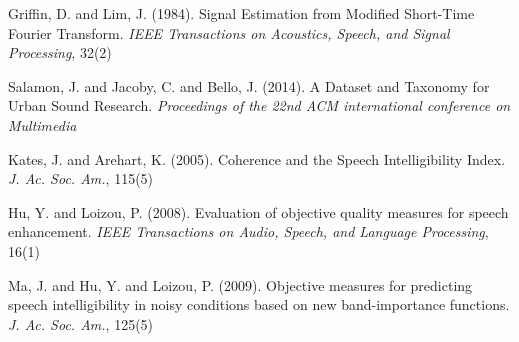 \documentclass[final,3p,times,twocolumn]{elsarticle}
\begin{document}
\begin{thebibliography}{09}
Griffin, D. and Lim, J. (1984). Signal Estimation from Modified Short-Time Fourier Transform. \textit{IEEE Transactions on Acoustics, Speech, and Signal Processing}, 32(2)

Salamon, J. and Jacoby, C. and Bello, J. (2014). A Dataset and Taxonomy for Urban Sound Research. \textit{Proceedings of the 22nd ACM international conference on Multimedia}

Kates, J. and Arehart, K. (2005). Coherence and the Speech Intelligibility Index. \textit{J. Ac. Soc. Am.}, 115(5)

Hu, Y. and Loizou, P. (2008). Evaluation of objective quality measures for speech enhancement. \textit{IEEE Transactions on Audio, Speech, and Language Processing}, 16(1)

Ma, J. and Hu, Y. and Loizou, P. (2009). Objective measures for predicting speech intelligibility in noisy conditions based on new band-importance functions. \textit{J. Ac. Soc. Am.}, 125(5)


\end{thebibliography}
\end{document}
